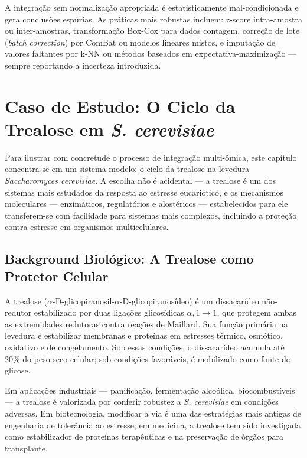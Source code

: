 A integração sem normalização apropriada é estatisticamente mal-condicionada
e gera conclusões espúrias. As práticas mais robustas incluem: z-score
intra-amostra ou inter-amostras, transformação Box-Cox para dados
contagem, correção de lote (\emph{batch correction}) por ComBat ou modelos
lineares mistos, e imputação de valores faltantes por k-NN ou métodos baseados
em expectativa-maximização --- sempre reportando a incerteza introduzida.


\section{Caso de Estudo: O Ciclo da Trealose em \textit{S. cerevisiae}}
\label{sec:11-trealose}

Para ilustrar com concretude o processo de integração multi-ômica, este
capítulo concentra-se em um sistema-modelo: o ciclo da trealose na levedura
\textit{Saccharomyces cerevisiae}. A escolha não é acidental --- a trealose é
um dos sistemas mais estudados da resposta ao estresse eucariótico, e os
mecanismos moleculares --- enzimáticos, regulatórios e alostéricos ---
estabelecidos para ele transferem-se com facilidade para sistemas mais
complexos, incluindo a proteção contra estresse em organismos multicelulares.

\subsection{Background Biológico: A Trealose como Protetor Celular}
\label{sub:image11-bio}

A trealose ($\alpha$-D-glicopiranosil-$\alpha$-D-glicopiranosídeo) é um
dissacarídeo não-redutor estabilizado por duas ligações glicosídicas
$\alpha{,}1 \to 1$, que protegem ambas as extremidades redutoras contra
reações de Maillard. Sua função primária na levedura é estabilizar membranas
e proteínas em estresses térmico, osmótico, oxidativo e de congelamento. Sob
essas condições, o dissacarídeo acumula até 20\% do peso seco celular; sob
condições favoráveis, é mobilizado como fonte de glicose.

Em aplicações industriais --- panificação, fermentação alcoólica,
biocombustíveis --- a trealose é valorizada por conferir robustez a
\textit{S. cerevisiae} em condições adversas. Em biotecnologia, modificar a
via é uma das estratégias mais antigas de engenharia de tolerância ao
estresse; em medicina, a trealose tem sido investigada como estabilizador de
proteínas terapêuticas e na preservação de órgãos para transplante.

